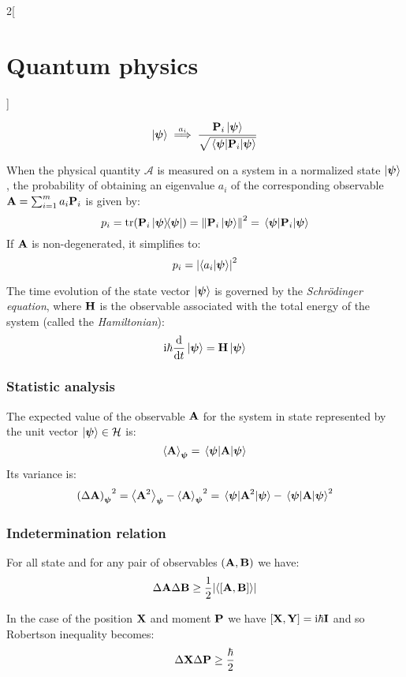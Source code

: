 \documentclass[../../../main_physics.tex]{subfiles}
\begin{document}
\begin{multicols}{2}[\section{Quantum physics}]
\begin{definition}
    $$\ket{\boldsymbol{\mathrm{\psi}}}\overset{a_i}{\implies}\frac{\boldsymbol{\mathrm{P}}_i\ket{\boldsymbol{\mathrm{\psi}}}}{\sqrt{\mel{\boldsymbol{\mathrm{\psi}}}{\boldsymbol{\mathrm{P}}_i}{\boldsymbol{\mathrm{\psi}}}}}$$
  \end{definition}
  \begin{definition}[Postulate IV]
    When the physical quantity $\mathcal{A}$ is measured on a system in a normalized state $\ket{\boldsymbol{\mathrm{\psi}}}$, the probability of obtaining an eigenvalue $a_i$ of the corresponding observable $\boldsymbol{\mathrm{A}}=\sum_{i=1}^ma_i\boldsymbol{\mathrm{P}}_i$ is given by:
    $$p_i=\trace(\vf{P}_i\dyad{\vf\psi}{\vf\psi})={\norm{\vf{P}_i\ket{\vf\psi}}}^2=\mel{\vf\psi}{\vf{P}_i}{\vf\psi}$$
    If $\boldsymbol{\mathrm{A}}$ is non-degenerated, it simplifies to: $$p_i={\abs{\braket{a_i}{\boldsymbol{\mathrm{\psi}}}}}^2$$
  \end{definition}
  \begin{definition}[Postulate V]
    The time evolution of the state vector $\ket{\boldsymbol{\mathrm{\psi}}}$ is governed by the \emph{Schrödinger equation}, where $\boldsymbol{\mathrm{H}}$ is the observable associated with the total energy of the system (called the \emph{Hamiltonian}): $$\mathrm{i} \hbar\dv{}{t}\ket{\boldsymbol{\mathrm{\psi}}}=\boldsymbol{\mathrm{H}}\ket{\boldsymbol{\mathrm{\psi}}}$$
  \end{definition}
  \subsubsection{Statistic analysis}
  \begin{proposition}
    The expected value of the observable $\boldsymbol{\mathrm{A}}$ for the system in state represented by the unit vector $\ket{\boldsymbol{\mathrm{\psi}}}\in\mathcal{H}$ is: $$\ev{\vf{A}}_{\vf\psi}=\ev{\vf{A}}{\vf\psi}$$
    Its variance is: $${{(\Delta\vf{A})}_{\vf\psi}}^2=\ev{\vf{A}^2}_{\vf\psi}-{\ev{\vf{A}}_{\vf\psi}}^2=\ev{\vf{A}^2}{\vf\psi}-\ev{\vf{A}}{\vf\psi}^2$$
  \end{proposition}
  \subsubsection{Indetermination relation}
  \begin{theorem}
    For all state and for any pair of observables $(\boldsymbol{\mathrm{A}},\boldsymbol{\mathrm{B}})$ we have: $$\Delta\vf{A}\Delta\vf{B}\geq \frac{1}{2}\abs{\langle\comm{\vf{A}}{\vf{B}}\rangle}$$
  \end{theorem}
  \begin{corollary}
    In the case of the position $\boldsymbol{\mathrm{X}}$ and moment $\boldsymbol{\mathrm{P}}$ we have $\comm{\vf{X}}{\vf{Y}}=\ii \hbar\vf{I}$ and so Robertson inequality becomes: $$\Delta\boldsymbol{\mathrm{X}}\Delta\boldsymbol{\mathrm{P}}\geq \frac{\hbar}{2}$$
  \end{corollary}

\end{multicols}
\end{document}
